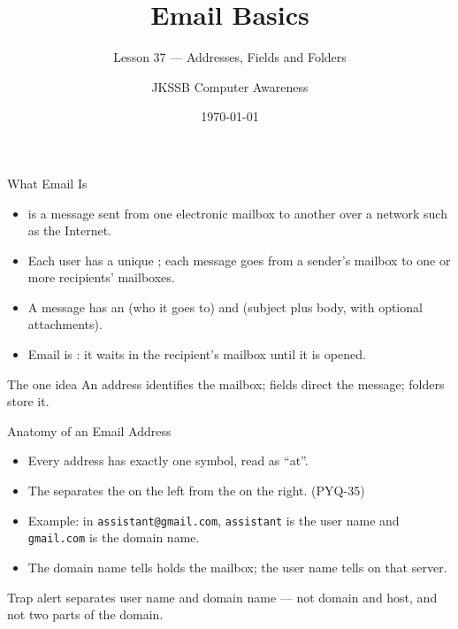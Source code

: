 \documentclass[aspectratio=169]{beamer}
\title{Email Basics}
\subtitle{Lesson 37 --- Addresses, Fields and Folders}
\author{JKSSB Computer Awareness}
\date{\today}
\begin{document}
\frame{\titlepage}

\begin{frame}{What Email Is}
  \begin{itemize}
    \item {} is a message sent from one electronic
      mailbox to another over a network such as the Internet.
    \item Each user has a unique ; each message goes from a
      sender's mailbox to one or more recipients' mailboxes.
    \item A message has an  (who it goes to) and 
      (subject plus body, with optional attachments).
    \item Email is : it waits in the recipient's mailbox
      until it is opened.
  \end{itemize}
  \begin{block}{The one idea}
    An address identifies the mailbox; fields direct the message; folders store it.
  \end{block}
\end{frame}

\begin{frame}{Anatomy of an Email Address}
  \begin{itemize}
    \item Every address has exactly one  symbol, read as ``at''.
    \item The  separates the  on the left from the
       on the right. (PYQ-35)
    \item Example: in \texttt{assistant@gmail.com}, \texttt{assistant} is the
      user name and \texttt{gmail.com} is the domain name.
    \item The domain name tells  holds the mailbox;
      the user name tells  on that server.
  \end{itemize}
  \begin{alertblock}{Trap alert}
     separates user name and domain name --- not domain and host, and
    not two parts of the domain.
  \end{alertblock}
\end{frame}
\end{document}
